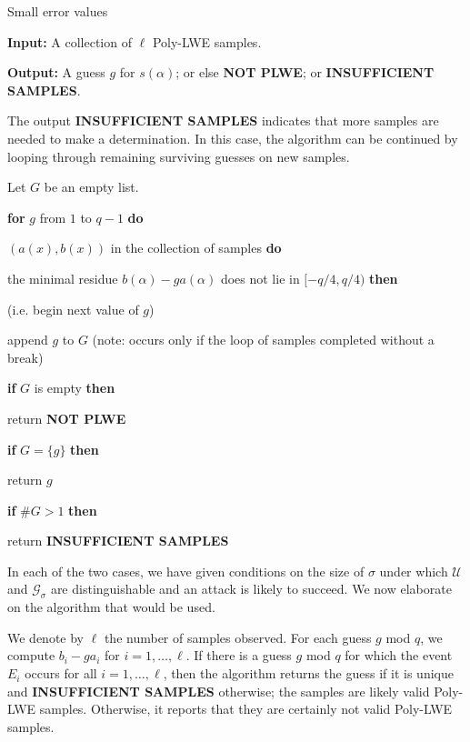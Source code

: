 \documentclass{llncs}
\newcommand{\<}{\langle}
\renewcommand{\>}{\rangle}
\begin{document}
\begin{algorithm}[H]
			\caption{Small error values}
			\label{alg:SmallError}
                        \raggedright
{\bf Input:} A collection of $\ell$ Poly-LWE samples.

{\bf Output:} A guess $g$ for $s(\alpha)$; or else {\bf NOT PLWE}; or {\bf INSUFFICIENT SAMPLES}.

The output {\bf INSUFFICIENT SAMPLES} indicates that more samples are needed to make a determination.  In this case, the algorithm can be continued by looping through remaining surviving guesses on new samples.

\vspace{1em}

Let $G$ be an empty list.

{\bf for} $g$ from $1$ to $q-1$ {\bf do}

\quad{} $(a(x), b(x))$ in the collection of samples {\bf do}

\quad \quad\quad{} the minimal residue $b(\alpha)- g a(\alpha)$ does not lie in $[-q/4,q/4)$ {\bf then}

\quad\quad\quad\quad\quad{} (i.e. begin next value of $g$)

\quad\quad append $g$ to $G$ (note: occurs only if the loop of samples completed without a break)

{\bf if} $G$ is empty {\bf then}

\quad\quad return {\bf NOT PLWE}

{\bf if} $G = \{ g \} $ {\bf then}

\quad\quad return $g$

{\bf if} $\#G > 1$ {\bf then}

\quad return {\bf INSUFFICIENT SAMPLES}

\end{algorithm}

In each of the two cases, we have given conditions on the size of $\sigma$ under which $\mathcal{U}$ and $\mathcal{G}_\sigma$ are distinguishable and an attack is likely to succeed.  We now elaborate on the algorithm that would be used.

We denote by $\ell$ the number of samples observed.
For each guess $g$ mod $q$, we compute $b_i - g a_i$ for $i=1, \ldots, \ell$.
If there is a guess $g$ mod $q$ for which the event $E_i$ occurs for all $i=1, \ldots,\ell$, then the algorithm returns the guess if it is unique and {\bf INSUFFICIENT SAMPLES} otherwise; the samples are likely valid Poly-LWE samples.
Otherwise, it reports that they are certainly not valid Poly-LWE samples.
\end{document}
